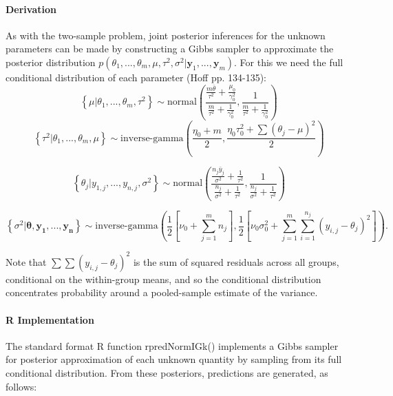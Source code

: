 \documentclass[12pt, a4paper]{article}
\begin{document}
      \paragraph{Derivation}
      As with the two-sample problem, joint posterior inferences for the unknown parameters can be made by constructing a Gibbs sampler to approximate the posterior distribution $p\left(\theta_1,...,\theta_m,\mu,\tau^2,\sigma^2|\mathbf{y}_1,...,\mathbf{y}_m\right)$.  For this we need the full conditional distribution of each parameter (Hoff pp. 134-135):
      $$\left\{\mu|\theta_1,...,\theta_m,\tau^2\right\} \sim \text{normal}\left(\dfrac{\frac{m\bar{\theta}}{\tau^2} + \frac{\mu_0}{\gamma^2_0}}{\frac{m}{\tau^2} + \frac{1}{\gamma^2_0}},\dfrac{1}{\frac{m}{\tau^2}+\frac{1}{\gamma^2_0}}\right)$$
      $$\left\{\tau^2|\theta_1,...,\theta_m,\mu\right\} \sim \text{inverse-gamma}\left(\dfrac{\eta_0 + m}{2},\dfrac{\eta_0\tau^2_0 + \sum\left(\theta_j-\mu\right)^2}{2}\right)$$

      $$\left\{\theta_j|y_{1,j},...,y_{n,j},\sigma^2\right\} \sim \text{normal}\left(\dfrac{\frac{n_j\bar{y}_j}{\sigma^2} + \frac{1}{\tau^2}}{\frac{n_j}{\sigma^2}+\frac{1}{\tau^2}},\dfrac{1}{\frac{n_j}{\sigma^2}+\frac{1}{\tau^2}}\right)$$

      $$\left\{\sigma^2|\mathbf{\theta,y_1,...,y_n}\right\} \sim \text{inverse-gamma}\left(\dfrac{1}{2}\left[\nu_0 + \sum_{j=1}^m n_j\right],\dfrac{1}{2}\left[\nu_0\sigma^2_0 + \sum_{j=1}^m\sum_{i=1}^{n_j}\left(y_{i,j}-\theta_j\right)^2\right]\right).$$

      Note that $\sum\sum\left(y_{i,j}-\theta_j\right)^2$ is the sum of squared residuals across all groups, conditional on the within-group means, and so the conditional distribution concentrates probability around a pooled-sample estimate of the variance.


      \paragraph{R Implementation}

      The standard format R function rpredNormIGk() implements a Gibbs sampler for posterior approximation of each unknown quantity by sampling from its full conditional distribution.  From these posteriors, predictions are generated, as follows:
\end{document}
